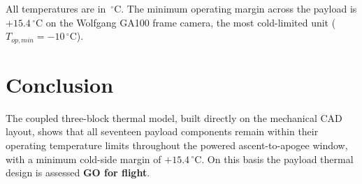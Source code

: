 \documentclass[11pt,a4paper]{article}
\newcommand{\degC}{\,^{\circ}\mathrm{C}}
\begin{document}
All temperatures are in $\degC$. The minimum operating margin across the payload is
$+15.4\degC$ on the Wolfgang GA100 frame camera, the most cold-limited unit
($T_{op,min}=-10\degC$).

\section{Conclusion}
The coupled three-block thermal model, built directly on the mechanical CAD layout,
shows that all seventeen payload components remain within their operating temperature
limits throughout the powered ascent-to-apogee window, with a minimum cold-side margin
of $+15.4\degC$. On this basis the payload thermal design is assessed
\textbf{GO for flight}.
\end{document}
